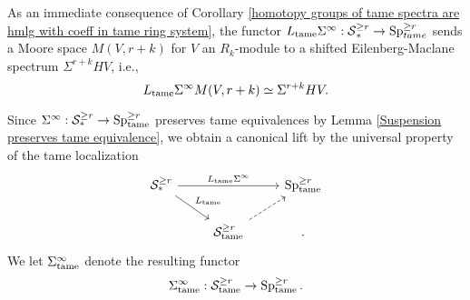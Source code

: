 \begin{remark}
\label{suspension tame sends Moore space to EM-space}
 As an immediate consequence of Corollary \ref{homotopy groups of tame spectra are hmlg with coeff in tame ring system}, the functor $L_{\operatorname{\operatorname{tame}}}\Sigma^{\infty}:\operatorname{\mathcal{S}}^{\geq r}_* \to \operatorname{Sp}^{\geq r}_{tame}$ sends a Moore space $M(V,r+k)$ for $V$ an $R_k$-module to a shifted  Eilenberg-Maclane spectrum $\Sigma^{r+k}HV$, i.e., 
 $$
 L_{\operatorname{\operatorname{tame}}} \Sigma^{\infty}M(V, r+k) \simeq \Sigma^{r+k} HV.
 $$
 
\end{remark}
%
%
\begin{notation}
Since $\Sigma^{\infty}:{\mathcal{S}}^{\geq r}_* \to \operatorname{Sp}^{\geq r}_{\operatorname{\operatorname{tame}}}$ preserves tame equivalences by Lemma \ref{Suspension preserves tame equivalence}, we obtain a canonical lift by the universal property of the tame localization
\[
	\begin{tikzcd}
		\CS^{\geq r}_* &   & \Sp^{\geq r}_{\tame}\\
		  & \CS^{\geq r}_{\tame} &
	\arrow[from=1-1, to=1-3, "L_{\tame}\Sigma^{\infty}"]
	\arrow[from=1-1, to=2-2, "L_{\tame}" ]
	\arrow[from=2-2, to=1-3, dashed].
	\end{tikzcd}
	\]
We let $\Sigma^{\infty}_{\operatorname{\operatorname{tame}}}$ denote the resulting functor
$$
\Sigma^{\infty}_{\operatorname{\operatorname{tame}}}:
{\mathcal{S}}^{\geq r}_{\operatorname{\operatorname{tame}}}
\to 
\operatorname{Sp}^{\geq r}_{\operatorname{\operatorname{tame}}}.
$$
\end{notation}



